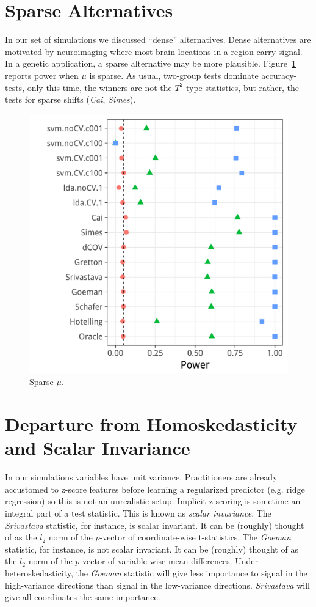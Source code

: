 \documentclass[oupdraft]{bio}
\begin{document}
\section{Sparse Alternatives}
\label{sec:sparse}

In our set of simulations we discussed ``dense'' alternatives.
Dense alternatives are motivated by neuroimaging where most brain locations in a region carry signal.
In a genetic application, a sparse alternative may be more plausible. 
Figure~\ref{fig:sparse} reports power when $\mu$ is sparse. 
As usual, two-group tests dominate accuracy-tests, only this time, the winners are not the $T^2$ type statistics, but rather, the tests for sparse shifts (\emph{Cai}, \emph{Simes}).

\begin{figure}[h]
	\centering
	\centering
	\includegraphics[width=0.5\columnwidth]{"file34"}
	\caption{Sparse $\mu$.}  
	\label{fig:sparse}	
\end{figure}





\section{Departure from Homoskedasticity and Scalar Invariance}

In our simulations variables have unit variance. 
Practitioners are already accustomed to z-score features before learning a regularized predictor (e.g. ridge regression) so this is not an unrealistic setup.
Implicit z-scoring is sometime an integral part of a test statistic. 
This is known as \emph{scalar invariance}.
The \emph{Srivastava} statistic, for instance, is scalar invariant. 
It can be (roughly) thought of as the $l_2$ norm of the $p$-vector of coordinate-wise t-statistics.
The \emph{Goeman} statistic, for instance, is not scalar invariant. 
It can be (roughly) thought of as the $l_2$ norm of the $p$-vector of variable-wise mean differences.
Under heteroskedasticity, the \emph{Goeman} statistic will give less importance to signal in the high-variance directions than signal in the low-variance directions. 
\emph{Srivastava} will give all coordinates the same importance.
\end{document}
